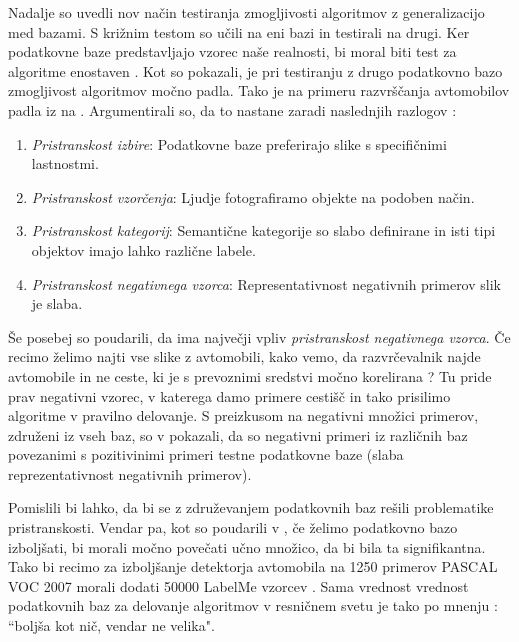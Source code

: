 Nadalje so uvedli nov način testiranja zmogljivosti algoritmov z generalizacijo med bazami. S križnim testom so učili na eni bazi in testirali na drugi. Ker podatkovne baze predstavljajo vzorec naše realnosti, bi moral biti test za algoritme enostaven \cite{torralba2011unbiased}. Kot so pokazali, je pri testiranju z drugo podatkovno bazo zmogljivost algoritmov močno padla. Tako je na primeru razvrščanja avtomobilov padla iz  na  \cite{torralba2011unbiased}. Argumentirali so, da to nastane zaradi naslednjih razlogov \cite{torralba2011unbiased}:

\begin{enumerate}
	\item \emph{Pristranskost izbire}: Podatkovne baze preferirajo slike s specifičnimi lastnostmi.
	\item \emph{Pristranskost vzorčenja}: Ljudje fotografiramo objekte na podoben način.
	\item \emph{Pristranskost kategorij}: Semantične kategorije so slabo definirane in isti tipi objektov imajo lahko različne labele. 
	\item \emph{Pristranskost negativnega vzorca}: Representativnost negativnih primerov slik je slaba.
\end{enumerate}

Še posebej so poudarili, da ima največji vpliv \emph{pristranskost negativnega vzorca}. Če recimo želimo najti vse slike z avtomobili, kako vemo, da razvrčevalnik najde avtomobile in ne ceste, ki je s prevoznimi sredstvi močno korelirana \cite{torralba2011unbiased}? Tu pride prav negativni vzorec, v katerega damo primere cestišč in tako prisilimo algoritme v pravilno delovanje. S preizkusom na negativni množici primerov, združeni iz vseh baz, so v \cite{torralba2011unbiased} pokazali, da so negativni primeri iz različnih baz povezanimi s pozitivinimi primeri testne podatkovne baze (slaba reprezentativnost negativnih primerov).

Pomislili bi lahko, da bi se  z združevanjem podatkovnih baz rešili problematike pristranskosti. Vendar pa, kot so poudarili v \cite{torralba2011unbiased}, če želimo podatkovno bazo izboljšati, bi morali močno povečati učno množico, da bi bila ta signifikantna. Tako bi recimo za izboljšanje detektorja avtomobila na 1250 primerov PASCAL VOC 2007 morali dodati 50000 LabelMe vzorcev \cite{torralba2011unbiased}. 
Sama vrednost vrednost podatkovnih baz za delovanje algoritmov v resničnem svetu je tako po mnenju : ``boljša kot nič, vendar ne velika".

